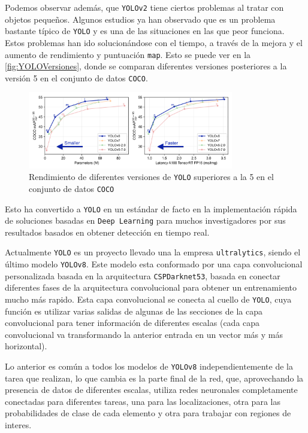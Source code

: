 Podemos observar además, que \texttt{YOLOv2} tiene ciertos problemas al tratar con objetos pequeños. Algunos estudios\cite{bhagyaOverviewDeepLearning2019} ya han observado que es un problema bastante típico de \texttt{YOLO} y es una de las situaciones en las que 
peor funciona.\newline
Estos problemas han ido solucionándose con el tiempo, a través de la mejora y el aumento de rendimiento y puntuación \texttt{\acrshort{map}}. Esto se puede ver en la \autoref{fig:YOLOVersiones}, donde se 
comparan diferentes versiones posteriores a la versión 5 en el conjunto de datos \texttt{COCO}.

\begin{figure}[H]
    \centering
    \includegraphics[width=0.8\textwidth]{images/4/YOLOVersiones.png}
    \caption{Rendimiento de diferentes versiones de \texttt{YOLO} superiores a la 5 en el conjunto de datos \texttt{COCO}\cite{ultralyticsYOLOv8}}
    \label{fig:YOLOVersiones}
\end{figure}

Esto ha convertido a \texttt{YOLO} en un estándar de facto en la implementación rápida de soluciones basadas en \texttt{Deep Learning} para muchos investigadores por sus resultados basados en obtener detección en tiempo real.

Actualmente \texttt{YOLO} es un proyecto llevado una la empresa \texttt{ultralytics}, siendo el último modelo \texttt{YOLOv8}. Este modelo esta conformado por una capa convolucional personalizada basada en la 
arquitectura \texttt{CSPDarknet53}, basada en conectar diferentes fases de la arquitectura convolucional para obtener un entrenamiento mucho más rapido. Esta capa convolucional se conecta al cuello de \texttt{YOLO}, 
cuya función es utilizar varias salidas de algunas de las secciones de la capa convolucional para tener información de diferentes escalas (cada capa convolucional va transformando la anterior entrada en un vector más y más horizontal).

Lo anterior es común a todos los modelos de \texttt{YOLOv8} independientemente de la tarea que realizan, lo que cambia es la parte final de la red, que, aprovechando la presencia de datos de diferentes escalas, 
utiliza redes neuronales completamente conectadas para diferentes tareas, una para las localizaciones, otra para las probabilidades de clase de cada elemento y otra para trabajar con regiones de interes.

